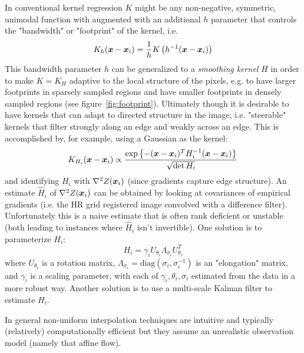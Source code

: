 In conventional kernel regression $K$ might be any non-negative, symmetric, unimodal\cite{wand1994kernel} function with augmented with an additional $h$ parameter that controls the "bandwidth" or "footprint" of the kernel, i.e.
\begin{equation}
    K_h(\bm{x} - \bm{x}_i) = \frac{1}{h}K\left( h^{-1}(\bm{x} - \bm{x}_i) \right)
\end{equation}
This bandwidth parameter $h$ can be generalized to a \textit{smoothing kernel} $H$ in order to make $K = K_H$ adaptive to the local structure of the pixels, e.g. to have larger footprints in sparsely sampled regions and have smaller footprints in densely sampled regions (see figure~\ref{fig:footprint}).
%
Ultimately though it is desirable to have kernels that can adapt to directed structure in the image, i.e. "steerable" kernels that filter strongly along an edge and weakly across an edge.
%
This is accomplished by, for example, using a Gaussian as the kernel:
\begin{equation}
    K_{H_i}(\bm{x} - \bm{x}_i) \propto \frac{\exp\left\{ -(\bm{x} - \bm{x}_i)^T H^{-1}_i (\bm{x} - \bm{x}_i) \right\}}{\sqrt{\det{H_i}}}
\end{equation}
and identifying $H_i$ with $\nabla^2 Z(\bm{x}_i)$ (since gradients capture edge structure).
%
An estimate $\hat{H}_i$ of $\nabla^2 Z(\bm{x}_i)$ can be obtained by looking at covariances of empirical gradients (i.e. the HR grid registered image convolved with a difference filter).
%
Unfortunately this is a naive estimate that is often rank deficient or unstable (both leading to instances where $\hat{H}_i$ isn't invertible).
%
One solution is to parameterize $H_i$:
\[
    H_i = \gamma_i U_{\theta_i} \Lambda_{\sigma_i} U_{\theta_i}^T
\]
where $U_{\theta_i}$ is a rotation matrix, $\Lambda_{\sigma_i} = \text{diag}\left( \sigma_i, \sigma_i^{-1} \right)$ is an "elongation" matrix, and $\gamma_i$ is a scaling parameter, with each of $\gamma_i, \theta_i, \sigma_i$ estimated from the data in a more robust way.
%
Another solution is to use a multi-scale Kalman filter to estimate $H_i$\cite{XiaoGuang}.

In general non-uniform interpolation techniques are intuitive and typically (relatively) computationally efficient but they assume an unrealistic observation model (namely that affine flow).
